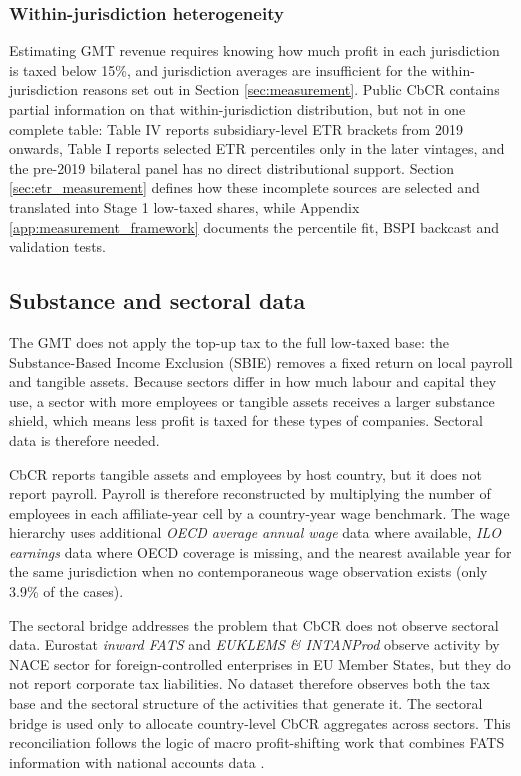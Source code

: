 \documentclass[11pt,a4paper]{article}
\begin{document}
\subsubsection{Within-jurisdiction heterogeneity}\label{sec:within-jurisdiction}

Estimating GMT revenue requires knowing how much profit in each jurisdiction is taxed below 15\%, and jurisdiction averages are insufficient for the within-jurisdiction reasons set out in Section \ref{sec:measurement}. Public CbCR contains partial information on that within-jurisdiction distribution, but not in one complete table: Table IV reports subsidiary-level ETR brackets from 2019 onwards, Table I reports selected ETR percentiles only in the later vintages, and the pre-2019 bilateral panel has no direct distributional support. Section \ref{sec:etr_measurement} defines how these incomplete sources are selected and translated into Stage 1 low-taxed shares, while Appendix \ref{app:measurement_framework} documents the percentile fit, BSPI backcast and validation tests.

\subsection{Substance and sectoral data}\label{sec:sectoral_data}\label{sec:substance_data}

The GMT does not apply the top-up tax to the full low-taxed base: the Substance-Based Income Exclusion (SBIE) removes a fixed return on local payroll and tangible assets. Because sectors differ in how much labour and capital they use, a sector with more employees or tangible assets receives a larger substance shield, which means less profit is taxed for these types of companies. Sectoral data is therefore needed. 

CbCR reports tangible assets and employees by host country, but it does not report payroll. Payroll is therefore reconstructed by multiplying the number of employees in each affiliate-year cell by a country-year wage benchmark. The wage hierarchy uses additional \emph{OECD average annual wage} data where available, \emph{ILO earnings} data where OECD coverage is missing, and the nearest available year for the same jurisdiction when no contemporaneous wage observation exists (only 3.9\% of the cases).

The sectoral bridge addresses the problem that CbCR does not observe sectoral data. Eurostat \emph{inward FATS} and \emph{EUKLEMS \& INTANProd} observe activity by NACE sector for foreign-controlled enterprises in EU Member States, but they do not report corporate tax liabilities. No dataset therefore observes both the tax base and the sectoral structure of the activities that generate it. The sectoral bridge is used only to allocate country-level CbCR aggregates across sectors. This reconciliation follows the logic of macro profit-shifting work that combines FATS information with national accounts data \citep{torslov2023}.
\end{document}
